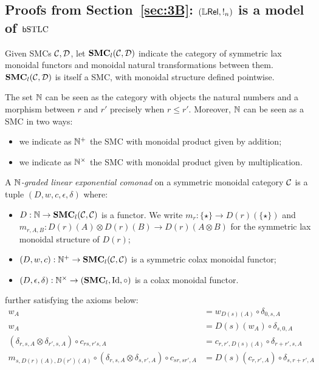\subsection{Proofs from Section~\ref{sec:3B}: $(\mathbb{L} \mathsf{Rel}, !_{n})$ is a model of $\mathsf b\mathrm{STLC}$}

Given SMCs $\mathcal{C},\mathcal{D}$,  let $\mathbf{SMC}_{l}(\mathcal{C}, \mathcal{D})$ indicate the category of symmetric lax monoidal functors and monoidal natural transformations between them.
$\mathbf{SMC}_{l}(\mathcal{C}, \mathcal{D})$  is itself a SMC, with monoidal structure defined pointwise.

The set 
$\mathbb{N}$ can be seen as the category with objects the natural numbers and a morphism between $r$ and $r'$ precisely when $r\leq r'$. 
Moreover, $\mathbb{N}$ can be seen as a SMC in two ways:
\begin{itemize}

\item we indicate as $\mathbb{N}^{+}$ the SMC with monoidal product given by addition;
\item we indicate as $\mathbb{N}^{\times}$ the SMC with monoidal product given by multiplication.
\end{itemize}



\begin{definition}
A \emph{$\mathbb{N}$-graded linear exponential comonad} on a symmetric monoidal category $\mathcal{C}$ is a tuple
$(D, w,c,\epsilon,\delta)$ where:
\begin{itemize}

\item $D: \mathbb{N}\to \mathbf{SMC}_{l}(\mathcal{C}, \mathcal{C})$ is a functor. We write 
$m_{r}:\{\star\} \to D(r)(\{\star\})$ and $m_{r,A,B}: D(r)(A)\otimes D(r)(B) \to D(r)(A\otimes B)$ for the symmetric lax monoidal structure of $D(r)$;

\item $(D,w,c): \mathbb{N}^{+}\to \mathbf{SMC}_{l}(\mathcal{C}, \mathcal{C})$ is a symmetric colax monoidal functor;

\item $(D,\epsilon,\delta):\mathbb{N}^{\times}\to (\mathbf{SMC}_{l},\mathrm{Id},\circ) $ is a colax monoidal functor.



\end{itemize}
further satisfying the axioms below:
\begin{align}
w_{A}& =  w_{D(s)(A)}\circ \delta_{0,s,A}\\
w_{A} & = D(s)(w_{A} )\circ \delta_{s,0,A} \\
(\delta_{r,s,A}\otimes \delta_{r',s,A})\circ c_{rs,r's,A}
&=
c_{r,r',D(s)(A)}\circ \delta_{r+r',s,A}\\
m_{s,D(r)(A),D(r')(A)}\circ (\delta_{r,s,A}\otimes \delta_{s,r',A})\circ c_{sr,sr',A}&=
D(s)(c_{r,r',A})\circ \delta_{s,r+r',A}
\end{align}
\end{definition}


